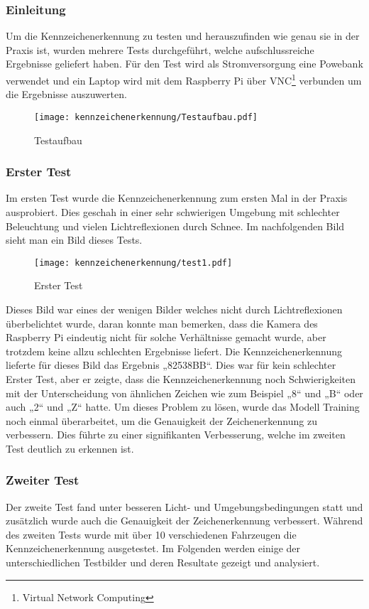 \subsubsection{Einleitung}
Um die Kennzeichenerkennung zu testen und herauszufinden wie genau sie in der Praxis ist, wurden mehrere Tests durchgeführt, welche aufschlussreiche Ergebnisse geliefert haben.
Für den Test wird als Stromversorgung eine Powebank verwendet und ein Laptop wird mit dem Raspberry Pi über VNC\footnote{Virtual Network Computing} verbunden um die Ergebnisse auszuwerten.

\begin{figure}[H]
    \centering
    \texttt{[image: kennzeichenerkennung/Testaufbau.pdf]}
    \caption{Testaufbau}
\end{figure}

\subsubsection{Erster Test}
Im ersten Test wurde die Kennzeichenerkennung zum ersten Mal in der Praxis ausprobiert. Dies geschah in einer sehr schwierigen Umgebung mit schlechter Beleuchtung 
und vielen Lichtreflexionen durch Schnee. Im nachfolgenden Bild sieht man ein Bild dieses Tests.

\begin{figure}[H]
    \centering
    \texttt{[image: kennzeichenerkennung/test1.pdf]}
    \caption{Erster Test}
\end{figure}

Dieses Bild war eines der wenigen Bilder welches nicht durch Lichtreflexionen überbelichtet wurde, daran konnte man bemerken, dass die Kamera des Raspberry Pi eindeutig 
nicht für solche Verhältnisse gemacht wurde, aber trotzdem keine allzu schlechten Ergebnisse liefert. Die Kennzeichenerkennung lieferte für dieses Bild das Ergebnis „82538BB“. 
Dies war für kein schlechter Erster Test, aber er zeigte, dass die Kennzeichenerkennung noch Schwierigkeiten mit der Unterscheidung von ähnlichen Zeichen wie zum Beispiel 
„8“ und „B“ oder auch „2“ und „Z“ hatte. Um dieses Problem zu lösen, wurde das Modell Training noch einmal überarbeitet, um die Genauigkeit der Zeichenerkennung zu verbessern. 
Dies führte zu einer signifikanten Verbesserung, welche im zweiten Test deutlich zu erkennen ist.

\subsubsection{Zweiter Test}
Der zweite Test fand unter besseren Licht- und Umgebungsbedingungen statt und zusätzlich wurde auch die Genauigkeit der Zeichenerkennung verbessert. 
Während des zweiten Tests wurde mit über 10 verschiedenen Fahrzeugen die Kennzeichenerkennung ausgetestet. Im Folgenden werden einige der unterschiedlichen Testbilder 
und deren Resultate gezeigt und analysiert.


